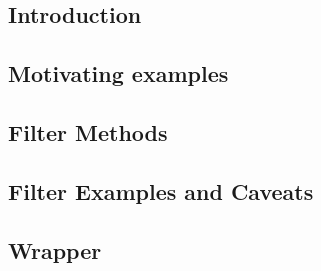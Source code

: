 
\subsection{Introduction}


\subsection{Motivating examples}


\subsection{Filter Methods}


\subsection{Filter Examples and Caveats}


\subsection{Wrapper}


%

%


